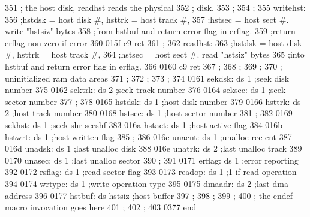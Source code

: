351                ;         the host disk, readhst reads the physical
352                ;         disk.
353                ;
354                ;
355                writehst:
356                          ;hstdsk = host disk #, hsttrk = host track #,
357                          ;hstsec = host sect #. write "hstsiz" bytes
358                          ;from hstbuf and return error flag in erflag.
359                          ;return erflag non-zero if error
360    015f c9               ret
361                ;
362                readhst:
363                          ;hstdsk = host disk #, hsttrk = host track #,
364                          ;hstsec = host sect #. read "hstsiz" bytes
365                          ;into hstbuf and return error flag in erflag.
366    0160 c9               ret
367                ;
368                ;
369                ;
370                ;         uninitialized ram data areas
371                ;
372                ;
373                ;
374    0161        sekdsk:   ds       1                      ;seek disk number
375    0162        sektrk:   ds       2                      ;seek track number
376    0164        seksec:   ds       1                      ;seek sector number
377                ;
378    0165        hstdsk:   ds       1                      ;host disk number
379    0166        hsttrk:   ds       2                      ;host track number
380    0168        hstsec:   ds       1                      ;host sector number
381                ;
382    0169        sekhst:   ds       1                      ;seek shr secshf
383    016a        hstact:   ds       1                      ;host active flag
384    016b        hstwrt:   ds       1                      ;host written flag
385                ;
386    016c        unacnt:   ds       1                      ;unalloc rec cnt
387    016d        unadsk:   ds       1                      ;last unalloc disk
388    016e        unatrk:   ds       2                      ;last unalloc track
389    0170        unasec:   ds       1                      ;last unalloc sector
390                ;
391    0171        erflag:   ds       1                      ;error reporting
392    0172        rsflag:   ds       1                      ;read sector flag
393    0173        readop:   ds       1                      ;1 if read operation
394    0174        wrtype:   ds       1                      ;write operation type
395    0175        dmaadr:   ds       2                      ;last dma address
396    0177        hstbuf:   ds       hstsiz                 ;host buffer
397                ;
398                ;
399                ;
400                ;         the endef macro invocation goes here
401                ;
402                ;
403    0377                  end









